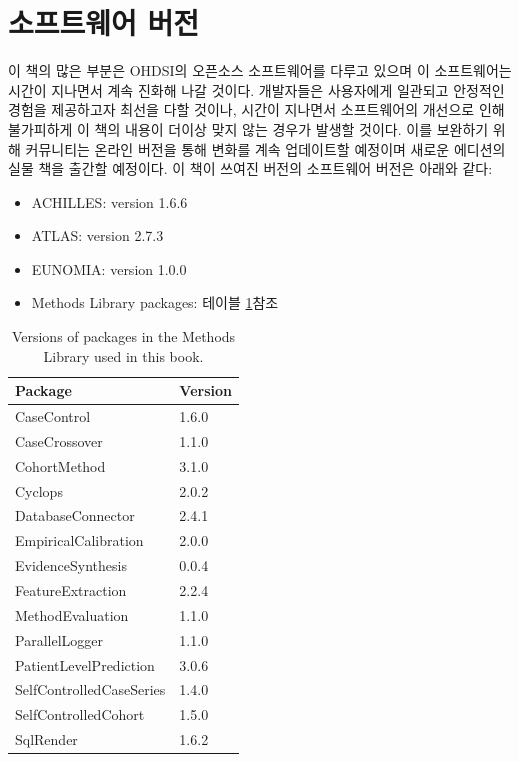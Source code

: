 \documentclass[10.5pt]{book}
\providecommand{\tightlist}{%
  \setlength{\itemsep}{0pt}\setlength{\parskip}{0pt}}
\theoremstyle{definition}
\theoremstyle{definition}
\theoremstyle{definition}
\theoremstyle{remark}
\begin{document}
\section*{소프트웨어 버전}\label{-}

이 책의 많은 부분은 OHDSI의 오픈소스 소프트웨어를 다루고 있으며 이
소프트웨어는 시간이 지나면서 계속 진화해 나갈 것이다. 개발자들은
사용자에게 일관되고 안정적인 경험을 제공하고자 최선을 다할 것이나,
시간이 지나면서 소프트웨어의 개선으로 인해 불가피하게 이 책의 내용이
더이상 맞지 않는 경우가 발생할 것이다. 이를 보완하기 위해 커뮤니티는
온라인 버전을 통해 변화를 계속 업데이트할 예정이며 새로운 에디션의 실물
책을 출간할 예정이다. 이 책이 쓰여진 버전의 소프트웨어 버전은 아래와
같다:

\begin{itemize}
\tightlist
\item
  ACHILLES: version 1.6.6
\item
  ATLAS: version 2.7.3
\item
  EUNOMIA: version 1.0.0
\item
  Methods Library packages: 테이블 \ref{tab:packageVersions}참조
\end{itemize}

\begin{table}[t]

\caption{\label{tab:packageVersions}Versions of packages in the Methods Library used in this book.}
\centering
\begin{tabular}{ll}
\toprule
Package & Version\\
\midrule
CaseControl & 1.6.0\\
CaseCrossover & 1.1.0\\
CohortMethod & 3.1.0\\
Cyclops & 2.0.2\\
DatabaseConnector & 2.4.1\\
\addlinespace
EmpiricalCalibration & 2.0.0\\
EvidenceSynthesis & 0.0.4\\
FeatureExtraction & 2.2.4\\
MethodEvaluation & 1.1.0\\
ParallelLogger & 1.1.0\\
\addlinespace
PatientLevelPrediction & 3.0.6\\
SelfControlledCaseSeries & 1.4.0\\
SelfControlledCohort & 1.5.0\\
SqlRender & 1.6.2\\
\bottomrule
\end{tabular}
\end{table}
\end{document}
